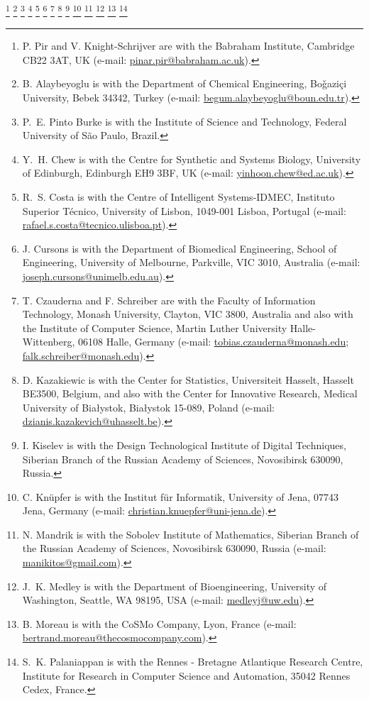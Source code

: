 \documentclass[journal,transmag]{IEEEtran}
\newcommand{\email}[1]{\href{mailto:#1}{#1}}
\begin{document}
{    \thanks{P. Pir and V. Knight-Schrijver are with the Babraham Institute, Cambridge CB22 3AT, UK (e-mail: \email{pinar.pir@babraham.ac.uk}).}
    \thanks{B. Alaybeyoglu is with the Department of Chemical Engineering, Bo\v{g}azi\c{c}i University, Bebek 34342, Turkey (e-mail: \email{begum.alaybeyoglu@boun.edu.tr}).}
    \thanks{P.~E. Pinto Burke is with the Institute of Science and Technology, Federal University of S\~{a}o Paulo, Brazil.}
    \thanks{Y.~H. Chew is with the Centre for Synthetic and Systems Biology, University of Edinburgh, Edinburgh EH9 3BF, UK (e-mail: \email{yinhoon.chew@ed.ac.uk}).}
    \thanks{R.~S. Costa is with the Centre of Intelligent Systems-IDMEC, Instituto Superior T{\'e}cnico, University of Lisbon, 1049-001 Lisboa, Portugal (e-mail: \email{rafael.s.costa@tecnico.ulisboa.pt}).}
    \thanks{J. Cursons is with the Department of Biomedical Engineering, School of Engineering, University of Melbourne, Parkville, VIC 3010, Australia (e-mail: \email{joseph.cursons@unimelb.edu.au}).}
    \thanks{T. Czauderna and F. Schreiber are with the Faculty of Information Technology, Monash University, Clayton, VIC 3800, Australia and also with the Institute of Computer Science, Martin Luther University Halle-Wittenberg, 06108 Halle, Germany (e-mail: \email{tobias.czauderna@monash.edu}; \email{falk.schreiber@monash.edu}).}
    \thanks{D. Kazakiewic is with the Center for Statistics, Universiteit Hasselt, Hasselt BE3500, Belgium, and also with the Center for Innovative Research, Medical University of Bia\l{}ystok, Bia\l{}ystok 15-089, Poland (e-mail: \email{dzianis.kazakevich@uhasselt.be}).}
    \thanks{I. Kiselev is with the Design Technological Institute of Digital Techniques, Siberian Branch of the Russian Academy of Sciences, Novosibirsk 630090, Russia.}
    \thanks{C. Kn\"{u}pfer is with the Institut f\"ur Informatik, University of Jena, 07743 Jena, Germany (e-mail: \email{christian.knuepfer@uni-jena.de}).}
    \thanks{N. Mandrik is with the Sobolev Institute of Mathematics, Siberian Branch of the Russian Academy of Sciences, Novosibirsk 630090, Russia (e-mail: \email{manikitos@gmail.com}).}
    \thanks{J.~K. Medley is with the Department of Bioengineering, University of Washington, Seattle, WA 98195, USA (e-mail: \email{medleyj@uw.edu}).}
    \thanks{B. Moreau is with the CoSMo Company, Lyon, France (e-mail: \email{bertrand.moreau@thecosmocompany.com}).}
    \thanks{S.~K. Palaniappan is with the Rennes - Bretagne Atlantique Research Centre, Institute for Research in Computer Science and Automation, 35042 Rennes Cedex, France.}
}
\end{document}
